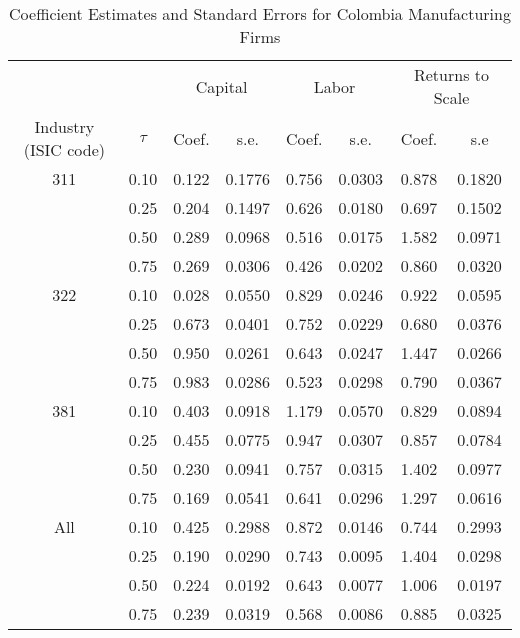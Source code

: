 \begin{table}[ht]
\centering
\caption{Coefficient Estimates and Standard Errors for Colombia Manufacturing Firms} 
\begin{tabular}{cccccccc}
  \hline\hline & & \multicolumn{2}{c}{Capital}  & \multicolumn{2}{c}{Labor} & \multicolumn{2}{c}{Returns to Scale} \\ \cmidrule(lr){3-4} \cmidrule(lr){5-6} \cmidrule(lr){7-8}Industry (ISIC code) & $\tau$ & Coef. & s.e. & Coef. & s.e. & Coef. & s.e \\ 
  \hline
311 & 0.10 & 0.122 & 0.1776 & 0.756 & 0.0303 & 0.878 & 0.1820 \\ 
   & 0.25 & 0.204 & 0.1497 & 0.626 & 0.0180 & 0.697 & 0.1502 \\ 
   & 0.50 & 0.289 & 0.0968 & 0.516 & 0.0175 & 1.582 & 0.0971 \\ 
   & 0.75 & 0.269 & 0.0306 & 0.426 & 0.0202 & 0.860 & 0.0320 \\ 
  322 & 0.10 & 0.028 & 0.0550 & 0.829 & 0.0246 & 0.922 & 0.0595 \\ 
   & 0.25 & 0.673 & 0.0401 & 0.752 & 0.0229 & 0.680 & 0.0376 \\ 
   & 0.50 & 0.950 & 0.0261 & 0.643 & 0.0247 & 1.447 & 0.0266 \\ 
   & 0.75 & 0.983 & 0.0286 & 0.523 & 0.0298 & 0.790 & 0.0367 \\ 
  381 & 0.10 & 0.403 & 0.0918 & 1.179 & 0.0570 & 0.829 & 0.0894 \\ 
   & 0.25 & 0.455 & 0.0775 & 0.947 & 0.0307 & 0.857 & 0.0784 \\ 
   & 0.50 & 0.230 & 0.0941 & 0.757 & 0.0315 & 1.402 & 0.0977 \\ 
   & 0.75 & 0.169 & 0.0541 & 0.641 & 0.0296 & 1.297 & 0.0616 \\ 
  All & 0.10 & 0.425 & 0.2988 & 0.872 & 0.0146 & 0.744 & 0.2993 \\ 
   & 0.25 & 0.190 & 0.0290 & 0.743 & 0.0095 & 1.404 & 0.0298 \\ 
   & 0.50 & 0.224 & 0.0192 & 0.643 & 0.0077 & 1.006 & 0.0197 \\ 
   & 0.75 & 0.239 & 0.0319 & 0.568 & 0.0086 & 0.885 & 0.0325 \\ 
   \hline
\end{tabular}
\end{table}
